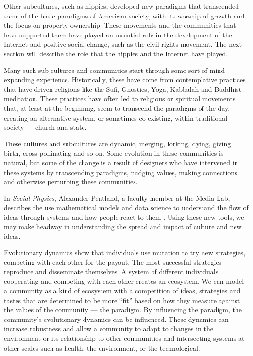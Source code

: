 Other subcultures, such as hippies, developed new paradigms that transcended some of the basic paradigms of American society, with its worship of growth and the focus on property ownership. These movements and the communities that have supported them have played an essential role in the development of the Internet and positive social change, such as the civil rights movement. The next section will describe the role that the hippies and the Internet have played.

Many such sub-cultures and communities start through some sort of mind-expanding experience. Historically, these have come from contemplative practices that have driven religions like the Sufi, Gnostics, Yoga, Kabbalah and Buddhist meditation. These practices have often led to religious or spiritual movements that, at least at the beginning, seem to transcend the paradigms of the day, creating an alternative system, or sometimes co-existing, within traditional society --- church and state.

These cultures and subcultures are dynamic, merging, forking, dying, giving birth, cross-pollinating and so on. Some evolution in these communities is natural, but some of the change is a result of designers who have intervened in these systems by transcending paradigms, nudging values, making connections and otherwise perturbing these communities.

In \textit{Social Physics}, Alexander Pentland, a faculty member at the Media Lab, describes the use mathematical models and data science to understand the flow of ideas through systems and how people react to them \cite{pentland2015social}. Using these new tools, we may make headway in understanding the spread and impact of culture and new ideas.

Evolutionary dynamics show that individuals use mutation to try new strategies, competing with each other for the payout. The most successful strategies reproduce and disseminate themselves. A system of different individuals cooperating and competing with each other creates an ecosystem. We can model a community as a kind of ecosystem with a competition of ideas, strategies and tastes that are determined to be more ``fit'' based on how they measure against the values of the community --- the paradigm. By influencing the paradigm, the community's evolutionary dynamics can be influenced. These dynamics can increase robustness and allow a community to adapt to changes in the environment or its relationship to other communities and intersecting systems at other scales such as health, the environment, or the technological.

